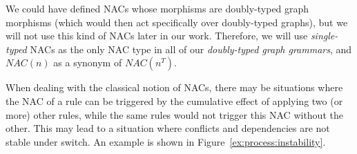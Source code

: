 \begin{remark}
We could have defined NACs whose morphisms are doubly-typed graph morphisms (which would then act specifically over doubly-typed graphs), but we will not use this kind of NACs later in our work. Therefore, we will use \emph{single-typed} NACs as the only NAC type in all of our \emph{doubly-typed graph grammars}, and $NAC(n)$ as a synonym of $NAC(n^T)$.

\end{remark}

 When dealing with the classical notion of NACs, there may be situations where the NAC of a rule can be triggered by the cumulative effect of applying two (or more) other rules, while the same rules would not trigger this NAC without the other. This may lead to a situation where conflicts and dependencies
are not stable under switch. An example is shown in Figure~\ref{ex:process:instability}.

